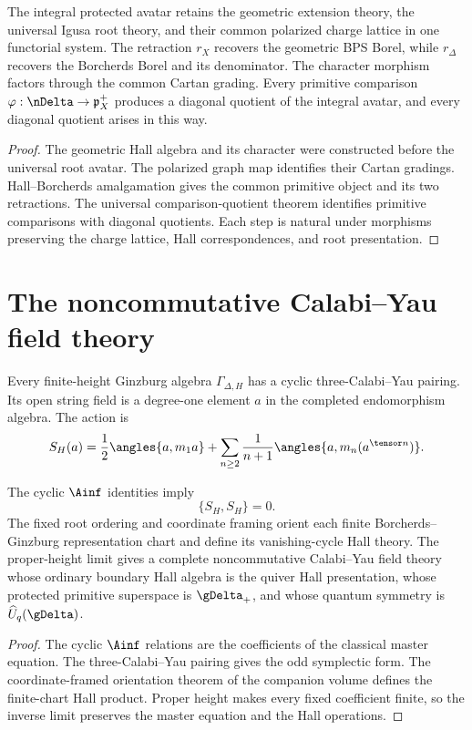 \begin{theorem}
The integral protected avatar retains the geometric extension theory, the universal Igusa root theory, and their common polarized charge lattice in one functorial system.  The retraction $r_X$ recovers the geometric BPS Borel, while $r_\Delta$ recovers the Borcherds Borel and its denominator.  The character morphism factors through the common Cartan grading.  Every primitive comparison $\varphi:\nDelta\to\mathfrak p_X^+$ produces a diagonal quotient of the integral avatar, and every diagonal quotient arises in this way.
\end{theorem}
\begin{proof}
The geometric Hall algebra and its character were constructed before the universal root avatar.  The polarized graph map identifies their Cartan gradings.  Hall--Borcherds amalgamation gives the common primitive object and its two retractions.  The universal comparison-quotient theorem identifies primitive comparisons with diagonal quotients.  Each step is natural under morphisms preserving the charge lattice, Hall correspondences, and root presentation.
\end{proof}

\chapter{The noncommutative Calabi--Yau field theory}
Every finite-height Ginzburg algebra $\Gamma_{\Delta,H}$ has a cyclic three-Calabi--Yau pairing.  Its open string field is a degree-one element $a$ in the completed endomorphism algebra.  The action is
\[
 S_H(a)=
 \frac12\angles{a,m_1a}
 +\sum_{n\ge2}\frac1{n+1}\angles{a,m_n(a^{\tensor n})}.
\]

\begin{theorem}
The cyclic $\Ainf$ identities imply
\[
 \{S_H,S_H\}=0.
\]
The fixed root ordering and coordinate framing orient each finite Borcherds--Ginzburg representation chart and define its vanishing-cycle Hall theory.  The proper-height limit gives a complete noncommutative Calabi--Yau field theory whose ordinary boundary Hall algebra is the quiver Hall presentation, whose protected primitive superspace is $\gDelta_+$, and whose quantum symmetry is $\widehat U_q(\gDelta)$.
\end{theorem}
\begin{proof}
The cyclic $\Ainf$ relations are the coefficients of the classical master equation.  The three-Calabi--Yau pairing gives the odd symplectic form.  The coordinate-framed orientation theorem of the companion volume defines the finite-chart Hall product.  Proper height makes every fixed coefficient finite, so the inverse limit preserves the master equation and the Hall operations.
\end{proof}

